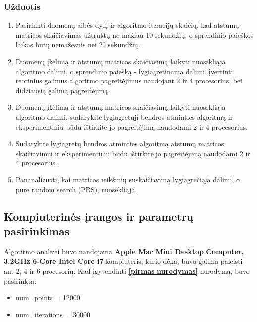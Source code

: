 \documentclass[a4paper,10pt]{article}
\begin{document}
\subsubsection{Užduotis}
\begin{enumerate}
	\item Pasirinkti duomenų aibės dydį ir algoritmo iteracijų skaičių, kad atstumų matricos skaičiavimas užtruktų ne mažiau 10 sekundžių, o sprendinio paieškos laikas būtų nemažesnis nei 20 sekundžių. \label{pirmas nurodymas}

	\item Duomenų įkėlimą ir atstumų matricos skaičiavimą laikyti nuosekliąja algoritmo dalimi, o sprendinio paiešką - lygiagretinama dalimi, įvertinti teorinius galimus algoritmo pagreitėjimus naudojant 2 ir 4 procesorius, bei didžiausią galimą pagreitėjimą. \label{antras nurodymas}

	\item Duomenų įkėlimą ir atstumų matricos skaičiavimą laikyti nuosekliąja algoritmo dalimi, sudarykite lygiagretųjį bendros atminties algoritmą ir eksperimentiniu būdu ištirkite jo pagreitėjimą naudodami 2 ir 4 procesorius. \label{trecias nurodymas}

	\item Sudarykite lygiagretų bendros atminties algoritmą atstumų matricos skaičiavimui ir eksperimentiniu būdu ištirkite jo pagreitėjimą naudodami 2 ir 4 procesorius. \label{ketvirtas nurodymas}

	\item Pananalizuoti, kai matricos reikšmių suskaičiavimą lygiagrečiąja dalimi, o pure random search (PRS), nuosekliąja. \label{penktas nurodymas}

\end{enumerate}
\newpage

\subsection{Kompiuterinės įrangos ir parametrų pasirinkimas}
Algoritmo analizei buvo naudojama \textbf{Apple Mac Mini Desktop Computer, 3.2GHz 6-Core Intel Core i7} kompiuteris, kurio dėka, buvo galima paleisti ant 2, 4 ir 6 procesorių.
Kad įgyvendinti \textbf{\ref{pirmas nurodymas}} nurodymą, buvo pasirinkta:
\begin{itemize}
	\item num\_points = 12000
	\item num\_iterations = 30000
\end{itemize}
\end{document}
